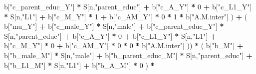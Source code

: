\documentclass[
]{book}
\newenvironment{Shaded}{\begin{snugshade}}{\end{snugshade}}
\newcommand{\DecValTok}[1]{\textcolor[rgb]{0.00,0.00,0.81}{#1}}
\newcommand{\NormalTok}[1]{#1}
\newcommand{\SpecialCharTok}[1]{\textcolor[rgb]{0.81,0.36,0.00}{\textbf{#1}}}
\newcommand{\StringTok}[1]{\textcolor[rgb]{0.31,0.60,0.02}{#1}}
\begin{document}
\begin{Shaded}
\begin{Highlighting}[]
\NormalTok{                                 b[}\StringTok{"c\_parent\_educ\_Y"}\NormalTok{] }\SpecialCharTok{*}\NormalTok{ S[n,}\StringTok{"parent\_educ"}\NormalTok{] }\SpecialCharTok{+} 
\NormalTok{                                 b[}\StringTok{"c\_A\_Y"}\NormalTok{] }\SpecialCharTok{*} \DecValTok{0} \SpecialCharTok{+} 
\NormalTok{                                 b[}\StringTok{"c\_L1\_Y"}\NormalTok{] }\SpecialCharTok{*}\NormalTok{ S[n,}\StringTok{"L1"}\NormalTok{] }\SpecialCharTok{+}
\NormalTok{                                 b[}\StringTok{"c\_M\_Y"}\NormalTok{] }\SpecialCharTok{*} \DecValTok{1} \SpecialCharTok{+}
\NormalTok{                                 b[}\StringTok{"c\_AM\_Y"}\NormalTok{] }\SpecialCharTok{*} \DecValTok{0} \SpecialCharTok{*} \DecValTok{1} \SpecialCharTok{*}\NormalTok{ b[}\StringTok{"A.M.inter"}\NormalTok{] ) }\SpecialCharTok{+} 
\NormalTok{                             ( b[}\StringTok{"mu\_Y"}\NormalTok{] }\SpecialCharTok{+} 
\NormalTok{                                 b[}\StringTok{"c\_male\_Y"}\NormalTok{] }\SpecialCharTok{*}\NormalTok{ S[n,}\StringTok{"male"}\NormalTok{] }\SpecialCharTok{+} 
\NormalTok{                                 b[}\StringTok{"c\_parent\_educ\_Y"}\NormalTok{] }\SpecialCharTok{*}\NormalTok{ S[n,}\StringTok{"parent\_educ"}\NormalTok{] }\SpecialCharTok{+} 
\NormalTok{                                 b[}\StringTok{"c\_A\_Y"}\NormalTok{] }\SpecialCharTok{*} \DecValTok{0} \SpecialCharTok{+} 
\NormalTok{                                 b[}\StringTok{"c\_L1\_Y"}\NormalTok{] }\SpecialCharTok{*}\NormalTok{ S[n,}\StringTok{"L1"}\NormalTok{] }\SpecialCharTok{+}
\NormalTok{                                 b[}\StringTok{"c\_M\_Y"}\NormalTok{] }\SpecialCharTok{*} \DecValTok{0} \SpecialCharTok{+}
\NormalTok{                                 b[}\StringTok{"c\_AM\_Y"}\NormalTok{] }\SpecialCharTok{*} \DecValTok{0} \SpecialCharTok{*} \DecValTok{0} \SpecialCharTok{*}\NormalTok{ b[}\StringTok{"A.M.inter"}\NormalTok{] )) }\SpecialCharTok{*}
\NormalTok{      ( b[}\StringTok{"b\_M"}\NormalTok{] }\SpecialCharTok{+} 
\NormalTok{          b[}\StringTok{"b\_male\_M"}\NormalTok{] }\SpecialCharTok{*}\NormalTok{ S[n,}\StringTok{"male"}\NormalTok{] }\SpecialCharTok{+} 
\NormalTok{          b[}\StringTok{"b\_parent\_educ\_M"}\NormalTok{] }\SpecialCharTok{*}\NormalTok{ S[n,}\StringTok{"parent\_educ"}\NormalTok{] }\SpecialCharTok{+}
\NormalTok{          b[}\StringTok{"b\_L1\_M"}\NormalTok{] }\SpecialCharTok{*}\NormalTok{ S[n,}\StringTok{"L1"}\NormalTok{] }\SpecialCharTok{+}
\NormalTok{          b[}\StringTok{"b\_A\_M"}\NormalTok{] }\SpecialCharTok{*} \DecValTok{0}\NormalTok{ ) }\SpecialCharTok{*} 

\end{Highlighting}
\end{Shaded}
\end{document}
